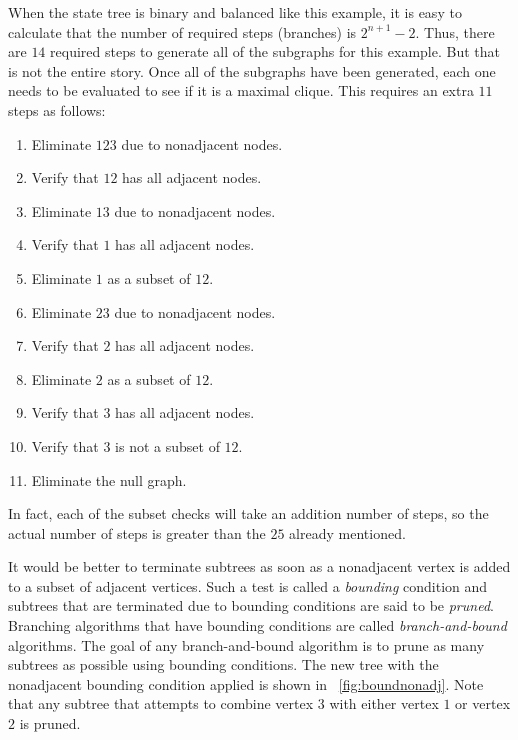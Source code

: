 When the state tree is binary and balanced like this example, it is easy to calculate that the number of required
steps (branches) is \(2^{n+1}-2\).  Thus, there are \(14\) required steps to generate all of the subgraphs for this
example.  But that is not the entire story.  Once all of the subgraphs have been generated, each one needs to be
evaluated to see if it is a maximal clique.  This requires an extra \(11\) steps as follows:
\begin{enumerate}
\item Eliminate \(123\) due to nonadjacent nodes.
\item Verify that \(12\) has all adjacent nodes.
\item Eliminate \(13\) due to nonadjacent nodes.
\item Verify that \(1\) has all adjacent nodes.
\item Eliminate \(1\) as a subset of \(12\).
\item Eliminate \(23\) due to nonadjacent nodes.
\item Verify that \(2\) has all adjacent nodes.
\item Eliminate \(2\) as a subset of \(12\).
\item Verify that \(3\) has all adjacent nodes.
\item Verify that \(3\) is not a subset of \(12\).
\item Eliminate the null graph.
\end{enumerate}

In fact, each of the subset checks will take an addition number of steps, so the actual number of steps is greater
than the \(25\) already mentioned.

It would be better to terminate subtrees as soon as a nonadjacent vertex is added to a subset of adjacent vertices.
Such a test is called a \emph{bounding} condition and subtrees that are terminated due to bounding conditions are
said to be \emph{pruned}.  Branching algorithms that have bounding conditions are called \emph{branch-and-bound}
algorithms.  The goal of any branch-and-bound algorithm is to prune as many subtrees as possible using bounding
conditions.  The new tree with the nonadjacent bounding condition applied is shown in
\figurename~\ref{fig:boundnonadj}.  Note that any subtree that attempts to combine vertex \(3\) with either vertex
\(1\) or vertex \(2\) is pruned.

